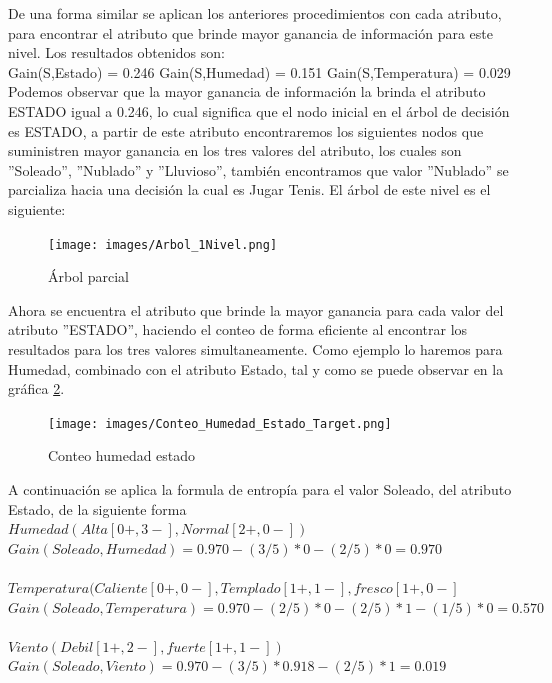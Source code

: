 De una forma similar se aplican los anteriores procedimientos con cada atributo,  para encontrar el atributo que
brinde mayor ganancia de informaci\'on para este nivel. Los resultados obtenidos son:\\

Gain(S,Estado) = 0.246
Gain(S,Humedad) = 0.151
Gain(S,Temperatura) = 0.029\\

Podemos observar que la mayor ganancia de informaci\'on la brinda el atributo ESTADO igual a 0.246, lo cual
significa que el nodo inicial en el \'arbol de decisi\'on es ESTADO, a partir de este atributo encontraremos los
siguientes nodos que suministren mayor ganancia en los tres valores del atributo, los cuales son ''Soleado'',
''Nublado'' y ''Lluvioso'', tambi\'en encontramos que valor ''Nublado'' se parcializa hacia una decisi\'on la cual
es Jugar Tenis. El \'arbol de este nivel es el siguiente:

\begin{figure}[h]
\centering
\texttt{[image: images/Arbol\_1Nivel.png]}
\caption{\'Arbol parcial}
\label{grac453}
\end{figure}

Ahora se encuentra el atributo que brinde la mayor ganancia para cada valor del atributo ''ESTADO'', haciendo el
conteo de forma eficiente al encontrar los resultados para los tres valores simultaneamente. Como ejemplo lo
haremos para Humedad, combinado con el atributo Estado, tal y como se puede observar en la gr\'afica \ref{grac454}.

\begin{figure}[t]
\centering
\texttt{[image: images/Conteo\_Humedad\_Estado\_Target.png]}
\caption{Conteo humedad \- estado}
\label{grac454}
\end{figure}

A continuaci\'on se aplica la formula de entrop\'ia para el valor Soleado, del  atributo Estado, de la siguiente
forma\\

$Humedad(Alta[0+,3-], Normal[2+,0-])$\\
$Gain(Soleado,Humedad) = 0.970-(3/ 5)*0-(2/ 5)*0=0.970$\\ \\
$Temperatura(Caliente[0+,0-],Templado[1+,1-],fresco[1+,0-]$\\
$Gain(Soleado,Temperatura)=0.970-(2/ 5)*0-(2/ 5)*1-(1/ 5)*0=0.570$\\ \\
$Viento(Debil[1+,2-], fuerte[1+,1-])$\\
$Gain(Soleado,Viento)=0.970-(3/ 5)*0.918-(2/ 5)*1=0.019$\\ \\

